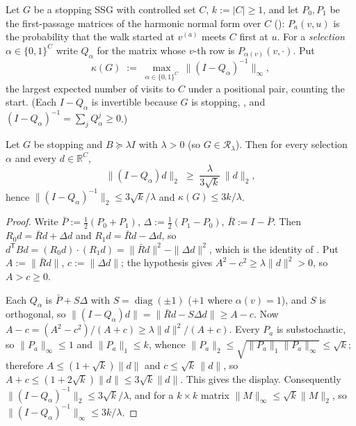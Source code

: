 
\begin{definition}\label{ht:def-visits}
Let $G$ be a stopping SSG with controlled set $C$, $k:=|C|\ge1$, and let
$P_0,P_1$ be the first-passage matrices of the harmonic normal form over
$C$ (): $P_a(v,u)$ is the probability that the
walk started at $v^{(a)}$ meets $C$ first at $u$. For a \emph{selection}
$\alpha\in\{0,1\}^{C}$ write $Q_\alpha$ for the matrix whose $v$-th row is
$P_{\alpha(v)}(v,\cdot)$. Put
\[
  \kappa(G)\;:=\;\max_{\alpha\in\{0,1\}^{C}}\ \bigl\|(I-Q_\alpha)^{-1}\bigr\|_\infty ,
\]
the largest expected number of visits to $C$ under a positional pair,
counting the start. (Each $I-Q_\alpha$ is invertible because $G$ is
stopping, , and $(I-Q_\alpha)^{-1}=\sum_j Q_\alpha^j\ge0$.)
\end{definition}

\begin{lemma}\label{ht:lem-sigmin}
Let $G$ be stopping and $B\succeq\lambda I$ with $\lambda>0$ (so
$G\in\mathcal R_\lambda$). Then for every selection $\alpha$ and every
$d\in\mathbb R^{C}$,
\[
  \|(I-Q_\alpha)d\|_2\;\ge\;\frac{\lambda}{3\sqrt k}\,\|d\|_2 ,
\]
hence $\|(I-Q_\alpha)^{-1}\|_2\le3\sqrt k/\lambda$ and
$\kappa(G)\le3k/\lambda$.
\end{lemma}

\begin{proof}
Write $\bar P:=\tfrac12(P_0+P_1)$, $\Delta:=\tfrac12(P_1-P_0)$,
$\bar R:=I-\bar P$. Then $R_0d=\bar Rd+\Delta d$ and $R_1d=\bar Rd-\Delta d$,
so $d^{\mathsf T}Bd=(R_0d)\cdot(R_1d)=\|\bar Rd\|^2-\|\Delta d\|^2$, which is the
identity of . Put $A:=\|\bar Rd\|$, $c:=\|\Delta d\|$;
the hypothesis gives $A^2-c^2\ge\lambda\|d\|^2>0$, so $A>c\ge0$.

Each $Q_\alpha$ is $\bar P+S\Delta$ with $S=\operatorname{diag}(\pm1)$
($+1$ where $\alpha(v)=1$), and $S$ is orthogonal, so
$\|(I-Q_\alpha)d\|=\|\bar Rd-S\Delta d\|\ge A-c$. Now
$A-c=(A^2-c^2)/(A+c)\ge\lambda\|d\|^2/(A+c)$. Every $P_a$ is substochastic,
so $\|P_a\|_\infty\le1$ and $\|P_a\|_1\le k$, whence
$\|P_a\|_2\le\sqrt{\|P_a\|_1\|P_a\|_\infty}\le\sqrt k$; therefore
$A\le(1+\sqrt k)\|d\|$ and $c\le\sqrt k\,\|d\|$, so $A+c\le(1+2\sqrt k)\|d\|\le3\sqrt k\|d\|$.
This gives the display. Consequently
$\|(I-Q_\alpha)^{-1}\|_2\le3\sqrt k/\lambda$, and for a $k\times k$ matrix
$\|M\|_\infty\le\sqrt k\|M\|_2$, so $\|(I-Q_\alpha)^{-1}\|_\infty\le3k/\lambda$.
\end{proof}

